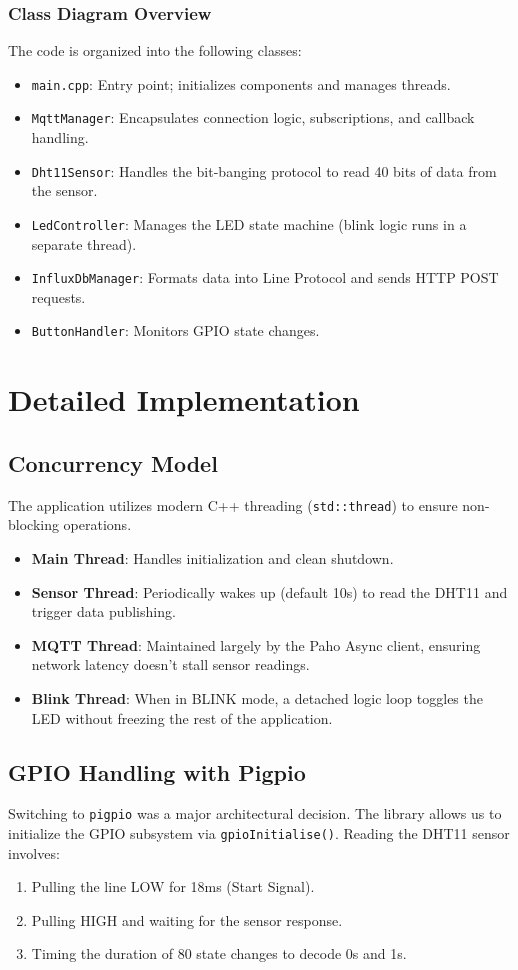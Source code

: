 \documentclass[12pt, a4paper]{article}
\begin{document}
\subsubsection{Class Diagram Overview}
The code is organized into the following classes:
\begin{itemize}
    \item \texttt{main.cpp}: Entry point; initializes components and manages threads.
    \item \texttt{MqttManager}: Encapsulates connection logic, subscriptions, and callback handling.
    \item \texttt{Dht11Sensor}: Handles the bit-banging protocol to read 40 bits of data from the sensor.
    \item \texttt{LedController}: Manages the LED state machine (blink logic runs in a separate thread).
    \item \texttt{InfluxDbManager}: Formats data into Line Protocol and sends HTTP POST requests.
    \item \texttt{ButtonHandler}: Monitors GPIO state changes.
\end{itemize}

\newpage

\section{Detailed Implementation}

\subsection{Concurrency Model}
The application utilizes modern C++ threading (\texttt{std::thread}) to ensure non-blocking operations.
\begin{itemize}
    \item \textbf{Main Thread}: Handles initialization and clean shutdown.
    \item \textbf{Sensor Thread}: Periodically wakes up (default 10s) to read the DHT11 and trigger data publishing.
    \item \textbf{MQTT Thread}: Maintained largely by the Paho Async client, ensuring network latency doesn't stall sensor readings.
    \item \textbf{Blink Thread}: When in BLINK mode, a detached logic loop toggles the LED without freezing the rest of the application.
\end{itemize}

\subsection{GPIO Handling with Pigpio}
Switching to \texttt{pigpio} was a major architectural decision. The library allows us to initialize the GPIO subsystem via \texttt{gpioInitialise()}.
Reading the DHT11 sensor involves:
\begin{enumerate}
    \item Pulling the line LOW for 18ms (Start Signal).
    \item Pulling HIGH and waiting for the sensor response.
    \item Timing the duration of 80 state changes to decode 0s and 1s.
\end{enumerate}
\end{document}
